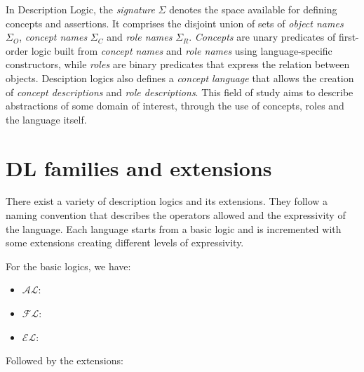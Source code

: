 In Description Logic, the \textit{signature} $\Sigma$ denotes the space available for defining concepts and assertions. It comprises the disjoint union of sets of \textit{object names} $\Sigma_{O}$, \textit{concept names} $\Sigma_{C}$ and \textit{role names} $\Sigma_{R}$. \textit{Concepts} are unary predicates of first-order logic built from \textit{concept names} and \textit{role names} using language-specific constructors, while \textit{roles} are binary predicates that express the relation between objects. Desciption logics also defines a \textit{concept language} that allows the creation of \textit{concept descriptions} and \textit{role descriptions}. This field of study aims to describe abstractions of some domain of interest, through the use of concepts, roles and the language itself.

\section{DL families and extensions}

There exist a variety of description logics and its extensions. They follow a naming convention that describes the operators allowed and the expressivity of the language. Each language starts from a basic logic and is incremented with some extensions creating different levels of expressivity.

For the basic logics, we have:

\begin{itemize}
    \item[] $\mathcal{AL}$:
    \item[] $\mathcal{FL}$:
    \item[] $\mathcal{EL}$:
\end{itemize}

Followed by the extensions:

